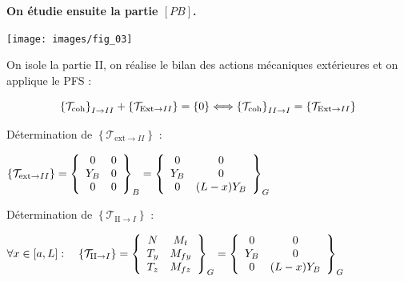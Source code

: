\documentclass[10pt,fleqn]{article} %
\begin{document}
\begin{corrige}

\textbf{On étudie ensuite la partie $[PB]$.}
\begin{center}
\texttt{[image: images/fig\_03]}
\end{center}

On isole la partie II, on réalise le bilan des actions mécaniques extérieures et on applique le PFS : 

$$
\torseurscoh_{I \rightarrow II} + \left\{\mathcal{T}_{\text{Ext}\rightarrow II}\right\}  = \{0\}
\Longleftrightarrow \torseurscoh_{II \rightarrow I} = \left\{\mathcal{T}_{\text{Ext}\rightarrow II}\right\}  
$$


Détermination de $\left\{\mathcal{T}_{\text{ext}\rightarrow II}\right\}$ :


$\left\{\mathcal{T}_{\text{ext}\rightarrow II}\right\}
=  \torseurcol{0}{Y_B}{0}{0}{0}{0}{B} 
=  \torseurcol{0}{Y_B}{0}{0}{0}{(L-x) Y_B}{G} 
$ 



Détermination de $ \left\{\mathcal{T}_{\text{II}\rightarrow I}\right\}$ :

$
\forall x \in [a,L] : \quad 
\left\{\mathcal{T}_{\text{II}\rightarrow I}\right\} 
= \torseurcol{N}{T_y}{T_z}{M_t}{M_{fy}}{M_{fz}}{G}
=  \torseurcol{0}{Y_B}{0}{0}{0}{(L-x) Y_B}{G} 
$

\end{corrige}



\else
\fi

\end{document}

